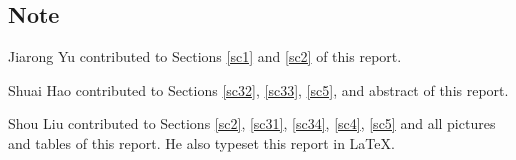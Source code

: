 \documentclass[english, table, latin9]{article}
\begin{document}
\subsection*{Note}
Jiarong Yu contributed to Sections \ref{sc1} and \ref{sc2} of this report.

\noindent Shuai Hao contributed to Sections \ref{sc32}, \ref{sc33}, \ref{sc5}, and abstract of this report.

\noindent Shou Liu contributed to Sections \ref{sc2}, \ref{sc31}, \ref{sc34}, \ref{sc4}, \ref{sc5} and all pictures and tables of this report. He also typeset this report in \LaTeX.
%
%
\end{document}
